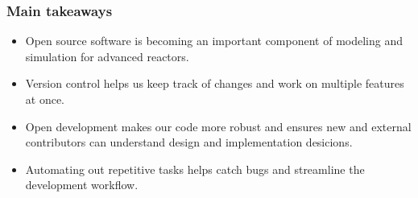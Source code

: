 \begin{frame}
    \frametitle{Main takeaways}
    \begin{itemize}
        \item Open source software is becoming an important component of modeling and simulation for advanced reactors.
        \item Version control helps us keep track of changes and work on multiple features at once.
        \item Open development makes our code more robust and ensures new and external contributors can understand design and implementation desicions.
        \item Automating out repetitive tasks helps catch bugs and streamline the development workflow. 
    \end{itemize}
\end{frame}
